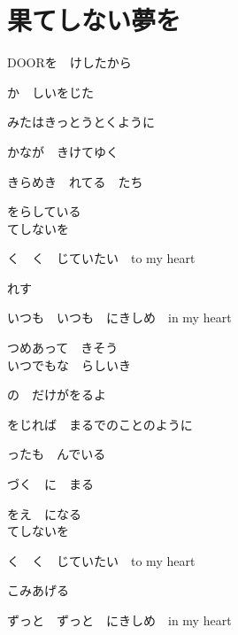 \section{ 果てしない夢を}
\large{

DOORを　けしたから

か　しいをじた

みたはきっとうとくように

かなが　きけてゆく

きらめき　れてる　たち

をらしている
\\

てしないを

く　く　じていたい　to my heart

れす

いつも　いつも　にきしめ　in my heart

つめあって　きそう
\\

いつでもな　らしいき

の　だけがをるよ

をじれば　まるでのことのように

ったも　んでいる

づく　に　まる

をえ　になる
\\

てしないを

く　く　じていたい　to my heart

こみあげる

ずっと　ずっと　にきしめ　in my heart

}

